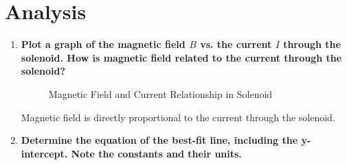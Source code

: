 \documentclass[article, 12pt]{article}
\begin{document}
     \section{Analysis}
     \begin{enumerate}[1.]
         \item \textbf{Plot a graph of the magnetic field $B$ vs. the current $I$ through the solenoid. How is magnetic field related to the current through the solenoid?}
         \begin{figure}[H]
            \centering
            \caption{Magnetic Field and Current Relationship in Solenoid}
            \label{fig:currentPlot}
         \end{figure}
         Magnetic field is directly proportional to the current through the solenoid.
         \item \textbf{Determine the equation of the best-fit line, including the y-intercept. Note the constants and
         their units.}


\end{enumerate}
\end{document}
